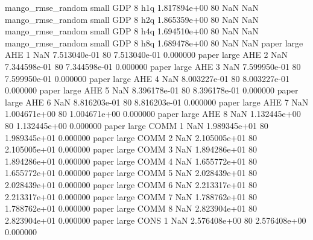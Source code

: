 mango_rmse_random      small      GDP                 8                  h1q 1.817894e+00 80            NaN                NaN
mango_rmse_random      small      GDP                 8                  h2q 1.865359e+00 80            NaN                NaN
mango_rmse_random      small      GDP                 8                  h4q 1.694510e+00 80            NaN                NaN
mango_rmse_random      small      GDP                 8                  h8q 1.689478e+00 80            NaN                NaN
            paper      large      AHE                 1                  NaN 7.513040e-01 80   7.513040e-01           0.000000
            paper      large      AHE                 2                  NaN 7.344598e-01 80   7.344598e-01           0.000000
            paper      large      AHE                 3                  NaN 7.599950e-01 80   7.599950e-01           0.000000
            paper      large      AHE                 4                  NaN 8.003227e-01 80   8.003227e-01           0.000000
            paper      large      AHE                 5                  NaN 8.396178e-01 80   8.396178e-01           0.000000
            paper      large      AHE                 6                  NaN 8.816203e-01 80   8.816203e-01           0.000000
            paper      large      AHE                 7                  NaN 1.004671e+00 80   1.004671e+00           0.000000
            paper      large      AHE                 8                  NaN 1.132445e+00 80   1.132445e+00           0.000000
            paper      large     COMM                 1                  NaN 1.989345e+01 80   1.989345e+01           0.000000
            paper      large     COMM                 2                  NaN 2.105005e+01 80   2.105005e+01           0.000000
            paper      large     COMM                 3                  NaN 1.894286e+01 80   1.894286e+01           0.000000
            paper      large     COMM                 4                  NaN 1.655772e+01 80   1.655772e+01           0.000000
            paper      large     COMM                 5                  NaN 2.028439e+01 80   2.028439e+01           0.000000
            paper      large     COMM                 6                  NaN 2.213317e+01 80   2.213317e+01           0.000000
            paper      large     COMM                 7                  NaN 1.788762e+01 80   1.788762e+01           0.000000
            paper      large     COMM                 8                  NaN 2.823904e+01 80   2.823904e+01           0.000000
            paper      large     CONS                 1                  NaN 2.576408e+00 80   2.576408e+00           0.000000

